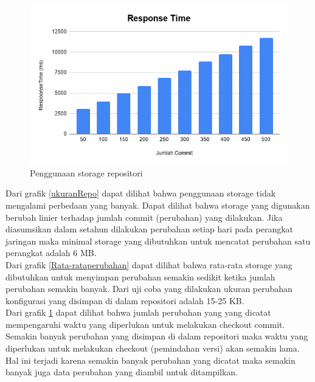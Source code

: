     \begin{figure}[H]
    	\centering
    	\includegraphics[width=\textwidth]{Images/C-5/Response-Time.png}
    	\caption{Penggunaan storage repositori}
    	\label{response time checkout}
    \end{figure}
    
    \indent Dari grafik \ref{ukuranRepo} dapat dilihat bahwa penggunaan storage tidak mengalami perbedaan yang banyak. Dapat dilihat bahwa storage yang digunakan berubah linier terhadap jumlah commit (perubahan) yang dilakukan. Jika diasumsikan dalam setahun dilakukan perubahan setiap hari pada perangkat jaringan maka minimal storage yang dibutuhkan untuk mencatat perubahan satu perangkat adalah 6 MB.\\
    \indent Dari grafik \ref{Rata-rataperubahan} dapat dilihat bahwa rata-rata storage yang dibutuhkan untuk menyimpan perubahan semakin sedikit ketika jumlah perubahan semakin banyak. Dari uji coba yang dilakukan ukuran perubahan konfigurasi yang disimpan di dalam repositori adalah 15-25 KB.\\
    \indent Dari grafik \ref{response time checkout} dapat dilihat bahwa jumlah  perubahan yang yang dicatat mempengaruhi waktu yang diperlukan untuk melakukan checkout commit. Semakin banyak perubahan yang disimpan di dalam repositori maka waktu yang diperlukan untuk melakukan checkout (pemindahan versi) akan semakin lama. Hal ini terjadi karena semakin banyak perubahan yang dicatat maka semakin banyak juga data perubahan yang diambil untuk ditampilkan.
     
    	